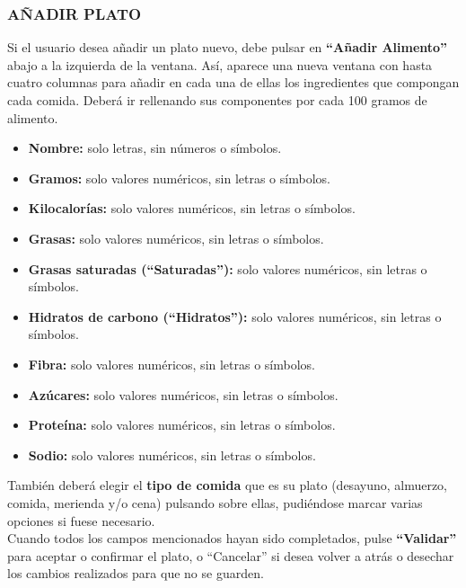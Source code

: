 \subsubsection{AÑADIR PLATO}
Si el usuario desea añadir un plato nuevo, debe pulsar en \textbf{“Añadir Alimento”} abajo a la izquierda de la ventana. Así, aparece una nueva ventana con hasta cuatro columnas para añadir en cada una de ellas los ingredientes que compongan cada comida. Deberá ir rellenando sus componentes por cada 100 gramos de alimento.
\begin{itemize}
\item	\textbf{Nombre:} solo letras, sin números o símbolos.
\item	\textbf{Gramos:} solo valores numéricos, sin letras o símbolos.
\item	\textbf{Kilocalorías:} solo valores numéricos, sin letras o símbolos.
\item	\textbf{Grasas:} solo valores numéricos, sin letras o símbolos.
\item	\textbf{Grasas saturadas (“Saturadas”):} solo valores numéricos, sin letras o símbolos.
\item	\textbf{Hidratos de carbono (“Hidratos”):} solo valores numéricos, sin letras o símbolos.
\item	\textbf{Fibra:} solo valores numéricos, sin letras o símbolos.
\item	\textbf{Azúcares:} solo valores numéricos, sin letras o símbolos.
\item	\textbf{Proteína:} solo valores numéricos, sin letras o símbolos.
\item	\textbf{Sodio:} solo valores numéricos, sin letras o símbolos.
\end{itemize}
También deberá elegir el \textbf{tipo de comida} que es su plato (desayuno, almuerzo, comida, merienda y/o cena) pulsando sobre ellas, pudiéndose marcar varias opciones si fuese necesario.\\
Cuando todos los campos mencionados hayan sido completados, pulse \textbf{“Validar”} para aceptar o confirmar el plato, o “Cancelar” si desea volver a atrás o desechar los cambios realizados para que no se guarden.\\

